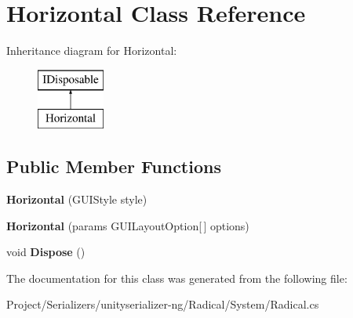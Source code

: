 \hypertarget{class_horizontal}{}\section{Horizontal Class Reference}
\label{class_horizontal}
Inheritance diagram for Horizontal\+:\begin{figure}[H]
\begin{center}
\leavevmode
\includegraphics[height=2.000000cm]{class_horizontal}
\end{center}
\end{figure}
\subsection*{Public Member Functions}
\begin{DoxyCompactItemize}
\item 
\mbox{\label{class_horizontal_a70640fe78e5264944ad7359f6eb9f0d2}} 
{\bfseries Horizontal} (G\+U\+I\+Style style)
\item 
\mbox{\label{class_horizontal_a6a9031bf0678fd40e1f1ea831c6cad0c}} 
{\bfseries Horizontal} (params G\+U\+I\+Layout\+Option\mbox{[}$\,$\mbox{]} options)
\item 
\mbox{\label{class_horizontal_a04962fe36ec16ab09988b50828c9fe16}} 
void {\bfseries Dispose} ()
\end{DoxyCompactItemize}


The documentation for this class was generated from the following file\+:\begin{DoxyCompactItemize}
\item 
Project/\+Serializers/unityserializer-\/ng/\+Radical/\+System/Radical.\+cs\end{DoxyCompactItemize}
